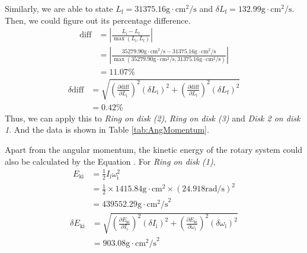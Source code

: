 Similarly, we are able to state $L_{\text{f}}=31375.16\text{g}\cdot\text{cm}^2\text{/s}$ and $\delta L_{\text{f}}=132.99\text{g}\cdot\text{cm}^2\text{/s}$. Then, we could figure out its percentage difference.
\begin{equation*}
  \begin{aligned}
    \text{diff} & = |\frac{L_{\text{i}}-L_{\text{f}}}{\max{(L_{\text{i}},L_{\text{f}})}}|                                                                                                                    \\
                & =|\frac{35279.90\text{g}\cdot\text{cm}^2\text{/s}-31375.16\text{g}\cdot\text{cm}^2\text{/s}}{\max{(35279.90\text{g}\cdot\text{cm}^2\text{/s},31375.16\text{g}\cdot\text{cm}^2\text{/s})}}| \\
                & =11.07\%
  \end{aligned}
\end{equation*}
\begin{equation*}
  \begin{aligned}
    \delta\text{diff} & = \sqrt{(\frac{\partial \text{diff}}{\partial L_{\text{i}}})^2(\delta L_{\text{i}})^2+(\frac{\partial \text{diff}}{\partial L_{\text{f}}})^2(\delta L_{\text{f}})^2} \\
                      & =0.42\%
  \end{aligned}
\end{equation*}
Thus, we can apply this to \emph{Ring on disk (2)}, \emph{Ring on disk (3)} and \emph{Disk 2 on disk 1}. And the data is shown in Table \ref{tab:AngMomentum}.\par
Apart from the angular momentum, the kinetic energy of the rotary system could also be calculated by the Equation . For \emph{Ring on disk (1)},
\begin{equation*}
  \begin{aligned}
    E_{\text{ki}} & =\frac{1}{2}I_{\text{i}}\omega_{\text{i}}^2                                   \\
                  & =\frac{1}{2}\times1415.84\text{g}\cdot\text{cm}^2\times(24.918\text{rad/s})^2 \\
                  & =439552.29\text{g}\cdot\text{cm}^2\text{/s}^2
  \end{aligned}
\end{equation*}
\begin{equation*}
  \begin{aligned}
    \delta E_{\text{ki}} & =\sqrt{(\frac{\partial E_{\text{ki}}}{\partial I_{\text{i}}})^2(\delta I_{\text{i}})^2+(\frac{\partial E_{\text{ki}}}{\partial \omega_{\text{i}}})^2(\delta \omega_{\text{i}})^2} \\
                         & =903.08\text{g}\cdot\text{cm}^2\text{/s}^2
  \end{aligned}
\end{equation*}
